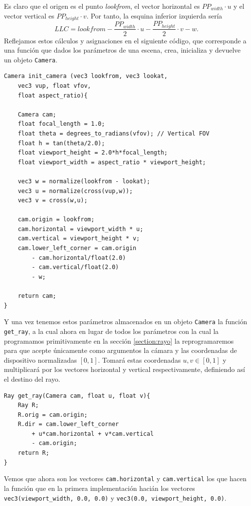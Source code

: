 Es claro que el origen es el punto \textit{lookfrom}, el vector horizontal es $PP_{width}\cdot u$ y el vector vertical es $PP_{height}\cdot v$. Por tanto, la esquina inferior izquierda sería
$$
LLC = lookfrom - \frac{PP_{width}}{2}\cdot u - \frac{PP_{height}}{2}\cdot v - w.
$$
Reflejamos estos cálculos y asignaciones en el siguiente código, que corresponde a una función que dados los parámetros de una escena, crea, inicializa y devuelve un objeto \verb|Camera|.
\begin{lstlisting}
Camera init_camera (vec3 lookfrom, vec3 lookat, 
    vec3 vup, float vfov, 
    float aspect_ratio){
    
    Camera cam;
    float focal_length = 1.0;
    float theta = degrees_to_radians(vfov); // Vertical FOV
    float h = tan(theta/2.0);
    float viewport_height = 2.0*h*focal_length;
    float viewport_width = aspect_ratio * viewport_height;

    vec3 w = normalize(lookfrom - lookat);
    vec3 u = normalize(cross(vup,w));
    vec3 v = cross(w,u);

    cam.origin = lookfrom;
    cam.horizontal = viewport_width * u;
    cam.vertical = viewport_height * v;
    cam.lower_left_corner = cam.origin 
        - cam.horizontal/float(2.0) 
        - cam.vertical/float(2.0)
        - w;

    return cam;
}
\end{lstlisting}

Y una vez tenemos estos parámetros almacenados en un objeto \verb|Camera| la función \verb|get_ray|, a la cual ahora en lugar de todos los parámetros con la cual la programamos primitivamente en la sección \ref{section:rayo} la reprogramaremos para que acepte únicamente como argumentos la cámara y las coordenadas de dispositivo normalizadas $[0,1]$. Tomará estas coordenadas $u,v\in[0,1]$ y multiplicará por los vectores horizontal y vertical respectivamente, definiendo así el destino del rayo.

\begin{lstlisting}
Ray get_ray(Camera cam, float u, float v){
    Ray R;
    R.orig = cam.origin;
    R.dir = cam.lower_left_corner 
        + u*cam.horizontal + v*cam.vertical 
        - cam.origin;
    return R;
}
\end{lstlisting}

Vemos que ahora son los vectores \verb|cam.horizontal| y \verb|cam.vertical| los que hacen la función que en la primera implementación hacián los vectores \verb|vec3(viewport_width, 0.0, 0.0)| y \verb|vec3(0.0, viewport_height, 0.0)|.

